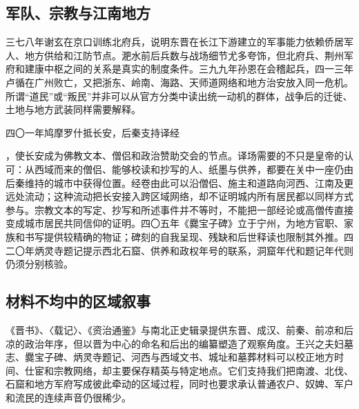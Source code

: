\subsection{军队、宗教与江南地方}

三七八年谢玄在京口训练北府兵，说明东晋在长江下游建立的军事能力依赖侨居军人、地方供给和江防节点。淝水前后兵数与战场细节尤多夸饰，但北府兵、荆州军府和建康中枢之间的关系是真实的制度条件。三九九年孙恩在会稽起兵，四一三年卢循在广州败亡，又把浙东、岭南、海路、天师道网络和地方治安放入同一危机。所谓“道民”或“叛民”并非可以从官方分类中读出统一动机的群体，战争后的迁徙、土地与地方武装同样需要解释。

\hypertarget{evt:JH-0401-KUMARAJIVA-CHANGAN}{\textcolor{dynasty}{四〇一年鸠摩罗什抵长安，后秦支持译经}}，使长安成为佛教文本、僧侣和政治赞助交会的节点。译场需要的不只是皇帝的认可：从西域而来的僧侣、能够校读和抄写的人、纸墨与供养，都要在关中一座仍由后秦维持的城市中获得位置。经卷由此可以沿僧侣、施主和道路向河西、江南及更远处流动；这种流动把长安接入跨区域网络，却不证明城内所有居民都以同样方式参与。宗教文本的写定、抄写和所述事件并不等时，不能把一部经论或高僧传直接变成城市居民共同信仰的证明。四〇五年《爨宝子碑》立于宁州，为地方官职、家族和书写提供较精确的物证；碑刻的自我呈现、残缺和后世释读也限制其外推。四二〇年炳灵寺题记提示西北石窟、供养和政权年号的联系，洞窟年代和题记年代则仍须分别核验。

\subsection{材料不均中的区域叙事}

《晋书》、〈载记〉、《资治通鉴》与南北正史辑录提供东晋、成汉、前秦、前凉和后凉的政治年序，但以晋为中心的命名和后出的编纂塑造了观察角度。王兴之夫妇墓志、爨宝子碑、炳灵寺题记、河西与西域文书、城址和墓葬材料可以校正地方时间、仕宦和宗教网络，却主要保存精英与特定地点。它们支持我们把南渡、北伐、石窟和地方军府写成彼此牵动的区域过程，同时也要求承认普通农户、奴婢、军户和流民的连续声音仍很稀少。

